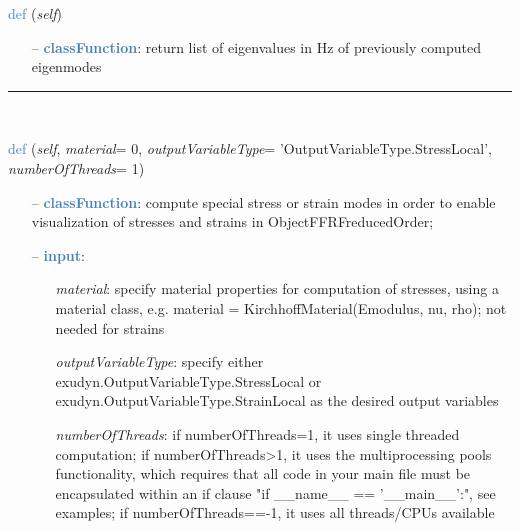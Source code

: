 \begin{itemize}[leftmargin=1.4cm]
\begin{itemize}[leftmargin=1.4cm]
\begin{itemize}[leftmargin=0.5cm]
\begin{itemize}[leftmargin=1.4cm]
\begin{itemize}[leftmargin=1.4cm]
\begin{itemize}[leftmargin=0.5cm]
\begin{flushleft}
\noindent \textcolor{steelblue}{def {\bf {}}}\label{sec:FEM:FEMinterface:GetEigenFrequenciesHz}
({\it self})
\end{flushleft}
\setlength{\itemindent}{0.7cm}
\begin{itemize}[leftmargin=0.7cm]
  \item[--]  \textcolor{steelblue}{\bf classFunction}: return list of eigenvalues in Hz of previously computed eigenmodes\vspace{12pt}\end{itemize}
%
\noindent\rule{8cm}{0.75pt}\vspace{1pt} \\ 
\begin{flushleft}
\noindent \textcolor{steelblue}{def {\bf {}}}\label{sec:FEM:FEMinterface:ComputePostProcessingModes}
({\it self}, {\it material}= 0, {\it outputVariableType}= 'OutputVariableType.StressLocal', {\it numberOfThreads}= 1)
\end{flushleft}
\setlength{\itemindent}{0.7cm}
\begin{itemize}[leftmargin=0.7cm]
  \item[--]  \textcolor{steelblue}{\bf classFunction}: compute special stress or strain modes in order to enable visualization of stresses and strains in ObjectFFRFreducedOrder;  \item[--]  \textcolor{steelblue}{\bf input}: \vspace{-6pt}
  \begin{itemize}[leftmargin=1.2cm]
\setlength{\itemindent}{-0.7cm}
    \item[] {\it material}: specify material properties for computation of stresses, using a material class, e.g. material = KirchhoffMaterial(Emodulus, nu, rho); not needed for strains
    \item[] {\it   outputVariableType}: specify either exudyn.OutputVariableType.StressLocal or exudyn.OutputVariableType.StrainLocal as the desired output variables
    \item[] {\it   numberOfThreads}: if numberOfThreads=1, it uses single threaded computation; if numberOfThreads>1, it uses the multiprocessing pools functionality, which requires that all code in your main file must be encapsulated within an if clause "if \_\_name\_\_ == '\_\_main\_\_':", see examples; if numberOfThreads==-1, it uses all threads/CPUs available

\end{itemize}
\end{itemize}
\end{itemize}
\end{itemize}
\end{itemize}
\end{itemize}
\end{itemize}
\end{itemize}
